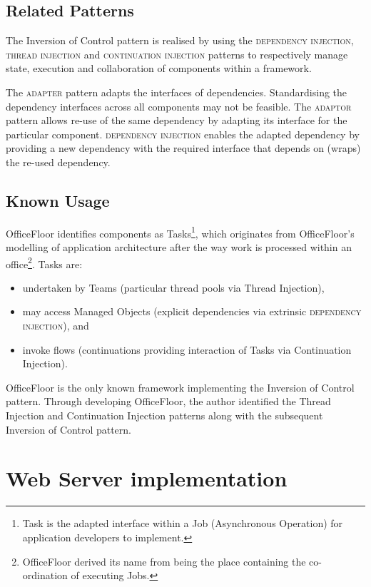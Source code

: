 \documentclass[prodmode]{style/acmlarge}
\begin{document}
\subsection{Related Patterns}

The Inversion of Control pattern is realised by using the \textsc{dependency
injection}, \textsc{thread injection} and \textsc{continuation injection}
patterns to respectively manage state, execution and collaboration of components
within a framework.

The \textsc{adapter} pattern \cite{gof} adapts the interfaces of dependencies.
Standardising the dependency interfaces across all components may not be
feasible.  The \textsc{adaptor} pattern allows re-use of the same dependency by
adapting its interface for the particular component.  \textsc{dependency
injection} enables the adapted dependency by providing a new dependency with the
required interface that depends on (wraps) the re-used dependency.


\subsection{Known Usage}

OfficeFloor \cite{officefloor} identifies components as Tasks\footnote{Task is
the adapted interface within a Job (Asynchronous Operation) for application
developers to implement.}, which originates from OfficeFloor's modelling of
application architecture after the way work is processed within an
office\footnote{OfficeFloor derived its name from being the place containing the
co-ordination of executing Jobs.}.  Tasks are:
\begin{itemize}
  \item undertaken by Teams (particular thread pools via Thread Injection),
  \item may access Managed Objects (explicit dependencies via extrinsic \textsc{dependency injection}), and
  \item invoke flows (continuations providing interaction of Tasks via Continuation Injection).
\end{itemize}

OfficeFloor is the only known framework implementing the Inversion of Control
pattern.  Through developing OfficeFloor, the author identified the Thread
Injection and Continuation Injection patterns along with the subsequent
Inversion of Control pattern.



\section{Web Server implementation}
\end{document}
